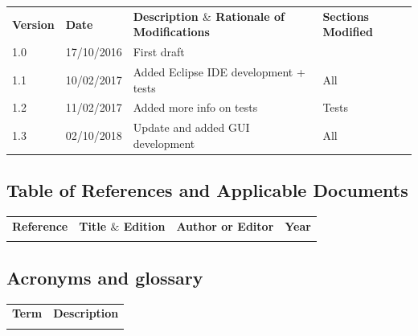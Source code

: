 \documentclass[12pt]{article}
\begin{document}
\begin{table}[H]
\large
\centering
\begin{adjustbox}{width=\textwidth}
\begin{tabular}{ |p{1.5cm}|p{2.5cm}|p{9.0cm}|p{3.0cm}| }
\hhline{----}
\textbf{Version} & \textbf{Date} & \textbf{Description  $  \&  $  Rationale of
Modifications} & \textbf{Sections Modified} \\
\hhline{----}
1.0 & 17/10/2016 & First draft &  \\ 
1.1 & 10/02/2017 & Added Eclipse IDE development + tests & All \\ 
1.2 & 11/02/2017 & Added more info on tests & Tests \\ 
1.3 & 02/10/2018 & Update and added GUI development & All\\
\hline
\end{tabular}
\end{adjustbox}
\end{table}

\subsection{Table of References and Applicable Documents}

\begin{table}[H]
\large
\centering
\begin{adjustbox}{width=\textwidth}
\begin{tabular}{ |p{2.66in}|p{2.66in}|p{0.95in}|p{0.43in}| }
\hhline{----}
\textbf{Reference} & \textbf{Title  $  \&  $  Edition} & \textbf{Author or
Editor} & \textbf{Year}
\\
\hhline{----}
 &  &  &  \\ 
\hline
\end{tabular}
\end{adjustbox}
\end{table}

\subsection{Acronyms and glossary}

\begin{table}[H]
\large
\centering
\begin{adjustbox}{width=\textwidth}
\begin{tabular}{ |p{1.24in}|p{5.45in}| }
\hhline{--}
\textbf{Term} & \textbf{Description} \\ 
\hhline{--}
 &  \\ 
\hline
\end{tabular}
\end{adjustbox}
\end{table}
\end{document}
